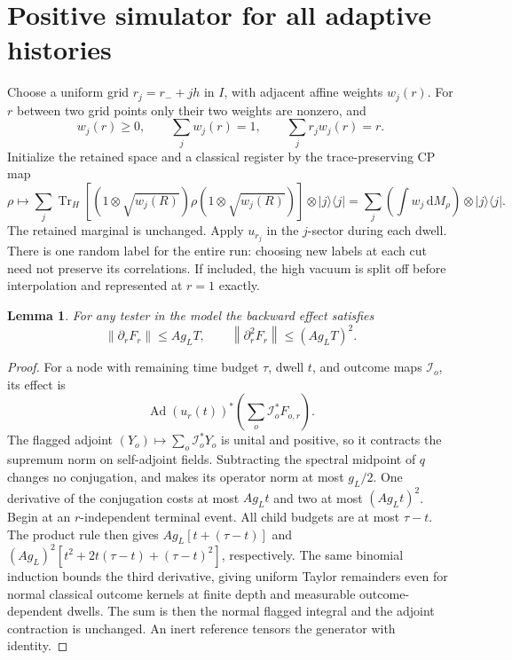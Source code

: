 \documentclass[11pt]{article}
\newtheorem{lemma}[theorem]{Lemma}
\theoremstyle{remark}
\newcommand{\tr}{\operatorname{Tr}}
\newcommand{\Ad}{\operatorname{Ad}}
\newcommand{\dd}{\mathrm{d}}
\newcommand{\norm}[1]{\left\lVert #1\right\rVert}
\newcommand{\proj}[1]{\lvert #1\rangle\!\langle #1\rvert}
\begin{document}
\section{Positive simulator for all adaptive histories}\label{sec:upper}

Choose a uniform grid \(r_j=r_-+jh\) in \(I\), with adjacent affine
weights \(w_j(r)\). For \(r\) between two grid points only their two
weights are nonzero, and
\[
 w_j(r)\ge0,\qquad
 \sum_j w_j(r)=1,\qquad
 \sum_j r_jw_j(r)=r.
\]
Initialize the retained space and a classical register by the
trace-preserving CP map
\begin{equation}\label{eq:init}
 \rho\longmapsto
 \sum_j\tr_H\!\left[(1\otimes \sqrt{w_j(R)})\rho
                      (1\otimes \sqrt{w_j(R)})\right]\otimes\proj j
   =\sum_j\left(\int w_j\,\dd M_\rho\right)\otimes\proj j.
\end{equation}
The retained marginal is unchanged. Apply \(u_{r_j}\) in the
\(j\)-sector during each dwell. There is one random label for the
entire run: choosing new labels at each cut need not preserve its
correlations. If included, the high vacuum is split off before
interpolation and represented at \(r=1\) exactly.

\begin{lemma}\label{lem:derivs}
For any tester in the model the backward effect satisfies
\[
 \norm{\partial_r F_r}\le A g_L T,\qquad
 \norm{\partial_r^2 F_r}\le (A g_L T)^2 .
\]
\end{lemma}
\begin{proof}
For a node with remaining time budget \(\tau\), dwell \(t\), and
outcome maps \(\mathcal I_o\), its effect is
\[
 \Ad(u_r(t))^*\left(\sum_o \mathcal I_o^*F_{o,r}\right).
\]
The flagged adjoint \((Y_o)\mapsto\sum_o\mathcal I_o^*Y_o\) is
unital and positive, so it contracts the supremum norm on
self-adjoint fields. Subtracting the spectral midpoint of \(q\)
changes no conjugation, and makes its operator norm at most \(g_L/2\).
One derivative of the conjugation costs at most \(A g_L t\) and two
at most \((A g_L t)^2\). Begin at an \(r\)-independent terminal event.
All child budgets are at most \(\tau-t\). The product rule then gives
\(A g_L[t+(\tau-t)]\) and
\((A g_L)^2[t^2+2t(\tau-t)+(\tau-t)^2]\), respectively. The same
binomial induction bounds the third derivative, giving uniform
Taylor remainders even for normal classical outcome kernels at
finite depth and measurable outcome-dependent dwells. The sum is
then the normal flagged integral and the adjoint contraction is
unchanged. An inert reference tensors the generator with identity.
\end{proof}
\end{document}
